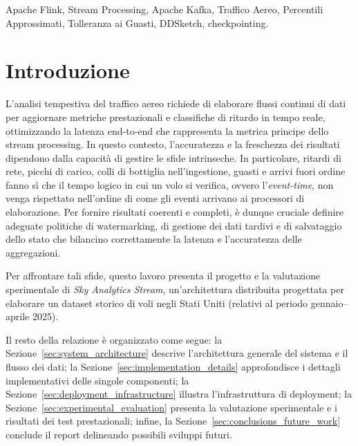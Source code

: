 \documentclass[conference]{IEEEtran}
\begin{document}

\begin{IEEEkeywords}
Apache Flink, Stream Processing, Apache Kafka, Traffico Aereo, Percentili Approssimati, Tolleranza ai Guasti, DDSketch, checkpointing.
\end{IEEEkeywords}




\section{Introduzione}\label{sec:introduction}

L'analisi tempestiva del traffico aereo richiede di elaborare flussi continui di dati per aggiornare metriche prestazionali e classifiche di ritardo in tempo reale, ottimizzando la latenza end-to-end che rappresenta la metrica principe dello stream processing. In questo contesto, l'accuratezza e la freschezza dei risultati dipendono dalla capacità di gestire le sfide intrinseche. In particolare, ritardi di rete, picchi di carico, colli di bottiglia nell'ingestione, guasti e arrivi fuori ordine fanno sì che il tempo logico in cui un volo si verifica, ovvero l'\emph{event-time}, non venga rispettato nell'ordine di come gli eventi arrivano ai processori di elaborazione. Per fornire risultati coerenti e completi, è dunque cruciale definire adeguate politiche di watermarking, di gestione dei dati tardivi e di salvataggio dello stato che bilancino correttamente la latenza e l'accuratezza delle aggregazioni.

Per affrontare tali sfide, questo lavoro presenta il progetto e la valutazione sperimentale di \textit{Sky Analytics Stream}, un'architettura distribuita progettata per elaborare un dataset storico di voli negli Stati Uniti (relativi al periodo gennaio--aprile 2025).

Il resto della relazione è organizzato come segue: la Sezione~\ref{sec:system_architecture} descrive l'architettura generale del sistema e il flusso dei dati; la Sezione~\ref{sec:implementation_details} approfondisce i dettagli implementativi delle singole componenti; la Sezione~\ref{sec:deployment_infrastructure} illustra l'infrastruttura di deployment; la Sezione~\ref{sec:experimental_evaluation} presenta la valutazione sperimentale e i risultati dei test prestazionali; infine, la Sezione~\ref{sec:conclusions_future_work} conclude il report delineando possibili sviluppi futuri.
\end{document}
